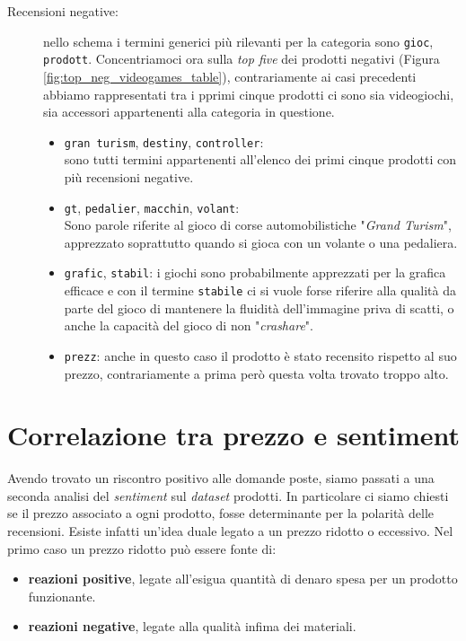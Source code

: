 \begin{description}
					\item[Recensioni negative:] 
					nello schema i termini generici più rilevanti per la categoria sono \verb|gioc|, \verb|prodott|. Concentriamoci ora sulla \textit{top five} dei prodotti negativi (Figura \ref{fig:top_neg_videogames_table}), contrariamente ai casi precedenti abbiamo rappresentati tra i pprimi cinque prodotti ci sono sia videogiochi, sia accessori appartenenti alla categoria in questione.
					\begin{itemize}
						\item \texttt{gran turism}, \texttt{destiny}, \texttt{controller}: \\
						sono tutti termini appartenenti all'elenco dei primi cinque prodotti con più recensioni negative. 
						\item \texttt{gt}, \texttt{pedalier}, \texttt{macchin}, \texttt{volant}: \\
						Sono parole riferite al gioco di corse automobilistiche "\textit{Grand Turism}", apprezzato soprattutto quando si gioca con un volante o una pedaliera. 
						\item \texttt{grafic}, \texttt{stabil}: 
						i giochi sono probabilmente apprezzati per la grafica efficace e con il termine \verb|stabile| ci si vuole forse riferire alla qualità da parte del gioco di  mantenere la fluidità dell'immagine priva di scatti, o anche la capacità del gioco di non "\textit{crashare}".
						\item \texttt{prezz}: 
						anche in questo caso il prodotto è stato recensito rispetto al suo prezzo, contrariamente a prima però questa volta trovato troppo alto.
					\end{itemize}
				\end{description}
				
		\section{Correlazione tra prezzo e sentiment}
			Avendo trovato un riscontro positivo alle domande poste, siamo passati a una seconda analisi del \textit{sentiment} sul \textit{dataset} prodotti. In particolare ci siamo chiesti se il prezzo associato a ogni prodotto, fosse determinante per la polarità delle recensioni. Esiste infatti un'idea duale legato a un prezzo ridotto o eccessivo. Nel primo caso un prezzo ridotto può essere fonte di:
			
			\begin{itemize}
				\item \textbf{reazioni positive}, legate all'esigua quantità di denaro spesa per un prodotto funzionante.
				\item \textbf{reazioni negative}, legate alla qualità infima dei materiali.
			\end{itemize}
		
